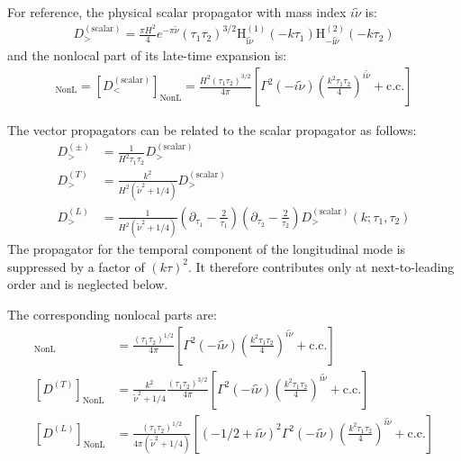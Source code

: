 \documentclass[a4paper,12pt]{article}
\def\tn{\tilde\nu}
\begin{document}
For reference, the physical scalar propagator with mass index $i\tilde\nu$ is:
\begin{align}
    D^{(\text{scalar})}_> = \frac{\pi H^2}{4} e^{-\pi \widetilde{\nu}}\left(\tau_{1} \tau_{2}\right)^{3 / 2} \mathrm{H}_{\mathrm{i} \widetilde{\nu}}^{(1)}\left(-k \tau_{1}\right) \mathrm{H}_{-\mathrm{i} \widetilde{\nu}}^{(2)}\left(-k \tau_{2}\right)
\end{align}
and the nonlocal part of its late-time expansion is:
\begin{align}
    [D^{(\text{scalar})}_>]_{\text{NonL}} = [D^{(\text{scalar})}_<]_{\text{NonL}} = \frac{H^2(\tau_1 \tau_2)^{3/2}}{4\pi} \left[ \Gamma^2(-i\tn) \left( \frac{k^2\tau_1\tau_2}{4} \right)^{i\tn} +\text{c.c.} \right]
\end{align}

The vector propagators can be related to the scalar propagator as follows:
\begin{align}
    D_>^{(\pm)} &= \frac{1}{H^2\tau_1 \tau_2} D^{(\text{scalar})}_> \\
    D_>^{(T)} &= \frac{k^2}{H^2(\tilde\nu^2 + 1/4)} D^{(\text{scalar})}_> \\
    D_{>}^{(L)} &= \frac{1}{H^2(\tilde\nu^2 + 1/4)}\left(\partial_{\tau_{1}}-\frac{2}{\tau_{1}}\right)\left(\partial_{\tau_{2}}-\frac{2}{\tau_{2}}\right) D_{>}^{(\text{scalar})}\left(k ; \tau_{1}, \tau_{2}\right)
\end{align}
The propagator for the temporal component of the longitudinal mode is suppressed by a factor of $(k\tau)^2$. It therefore contributes only at next-to-leading order and is neglected below.

The corresponding nonlocal parts are:
\begin{align}
    [D^{(\pm)}]_{\text{NonL}} &= \frac{(\tau_1 \tau_2)^{1/2}}{4\pi} \left[ \Gamma^2(-i\tn) \left( \frac{k^2\tau_1\tau_2}{4} \right)^{i\tn} +\text{c.c.} \right] \\
    [D^{(T)}]_{\text{NonL}} &= \frac{k^2}{\tilde\nu^2 + 1/4} \frac{(\tau_1 \tau_2)^{3/2}}{4\pi} \left[ \Gamma^2(-i\tn) \left( \frac{k^2\tau_1\tau_2}{4} \right)^{i\tn} +\text{c.c.} \right] \\
    [D^{(L)}]_{\text{NonL}} &= \frac{(\tau_1 \tau_2)^{1/2}}{4\pi(\tilde\nu^2 + 1/4)} \left[ (-1/2+i\tn)^2 \Gamma^2(-i\tn) \left( \frac{k^2\tau_1\tau_2}{4} \right)^{i\tn} +\text{c.c.} \right]
\end{align}
\end{document}
